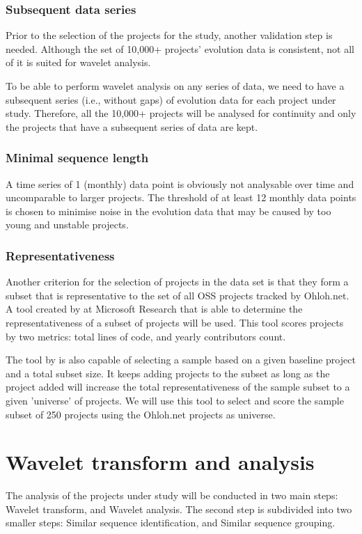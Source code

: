\subsubsection{Subsequent data series}
Prior to the selection of the projects for the study, another validation
step is needed. Although the set of 10,000+ projects' evolution data is
consistent, not all of it is suited for wavelet analysis.

To be able to perform wavelet analysis on any series of data, we need to have
a subsequent series (i.e., without gaps) of evolution data for each project
under study. Therefore, all the 10,000+ projects will be analysed for continuity
and only the projects that have a subsequent series of data are kept.

\subsubsection{Minimal sequence length}
A time series of 1 (monthly) data point is obviously not analysable over time
and uncomparable to larger projects. The threshold of at least 12 monthly data
points is chosen to minimise noise in the evolution data that may be caused by
too young and unstable projects.

\subsubsection{Representativeness}
Another criterion for the selection of projects in the data set is that they
form a subset that is representative to the set of all OSS projects tracked by
Ohloh.net. A tool created by \citet{nagappan} at Microsoft Research that is able
to determine the representativeness of a subset of projects will be used. This
tool scores projects by two metrics: total lines of code, and yearly
contributors count.

The tool by \citet{nagappan} is also capable of selecting a sample based on a
given baseline project and a total subset size. It keeps adding projects to the
subset as long as the project added will increase the total representativeness
of the sample subset to a given 'universe' of projects. We will use this tool
to select and score the sample subset of 250 projects using the Ohloh.net
projects as universe.



\section{Wavelet transform and analysis}
The analysis of the projects under study will be conducted in two main steps:
Wavelet transform, and Wavelet analysis. The second step is subdivided into two
smaller steps: Similar sequence identification, and Similar sequence grouping.

